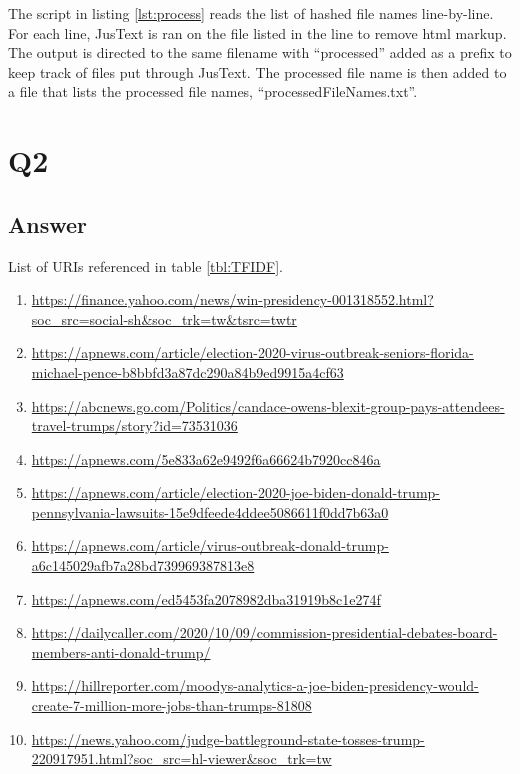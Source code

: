\documentclass[12pt]{article}
\begin{document}
The script in listing \ref{lst:process} reads the list of hashed file names line-by-line.  For each line, JusText is ran on the file listed in the line to remove html markup.  The output is directed to the same filename with ``processed'' added as a prefix to keep track of files put through JusText.  The processed file name is then added to a file that lists the processed file names, ``processedFileNames.txt''.


\section*{Q2}

\subsection*{Answer}







List of URIs referenced in table \ref{tbl:TFIDF}.

\begin{enumerate}

    \item \url{ https://finance.yahoo.com/news/win-presidency-001318552.html?soc_src=social-sh&soc_trk=tw&tsrc=twtr }
    \item \url{ https://apnews.com/article/election-2020-virus-outbreak-seniors-florida-michael-pence-b8bbfd3a87dc290a84b9ed9915a4cf63 }
    \item \url{ https://abcnews.go.com/Politics/candace-owens-blexit-group-pays-attendees-travel-trumps/story?id=73531036 }
    \item \url{ https://apnews.com/5e833a62e9492f6a66624b7920cc846a }
    \item \url{ https://apnews.com/article/election-2020-joe-biden-donald-trump-pennsylvania-lawsuits-15e9dfeede4ddee5086611f0dd7b63a0 }
    \item \url{ https://apnews.com/article/virus-outbreak-donald-trump-a6c145029afb7a28bd739969387813e8 }
    \item \url{ https://apnews.com/ed5453fa2078982dba31919b8c1e274f }
    \item \url{ https://dailycaller.com/2020/10/09/commission-presidential-debates-board-members-anti-donald-trump/ }
    \item \url{ https://hillreporter.com/moodys-analytics-a-joe-biden-presidency-would-create-7-million-more-jobs-than-trumps-81808 }
    \item \url{ https://news.yahoo.com/judge-battleground-state-tosses-trump-220917951.html?soc_src=hl-viewer&soc_trk=tw }
    
\end{enumerate}
\end{document}
